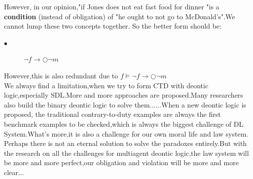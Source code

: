 \documentclass{article}
\begin{document}
However, in our opinion,"if Jones does not eat fast food for dinner "is a \textbf{condition} (instead of obligation) of "he ought to not go to McDonald's".We cannot lump these two concepts together.
So the better form should be:
\begin{description}
\item[$\bullet$]$ \neg f \rightarrow \bigcirc \neg m$
\end{description}
However,this is also redundant due to $f \vDash\neg f \rightarrow \bigcirc \neg m $\\
We always find a limitation,when we try to form CTD with deontic logic,especially SDL.More and more approaches are proposed.Many researchers also build the binary deontic logic to solve them......When a new deontic logic is proposed, the traditional contrary-to-duty examples are always the first benchmark examples to be checked,which is always the biggest challenge of DL System.What's more,it is also a challenge for our own moral life and law system.
Perhaps there is not an eternal solution to solve the paradoxes entirely.But with the research on all the challenges for multiagent deontic logic,the law system will be more and more perfect,our obligation and violation will be more and more clear... 



\end{document}
